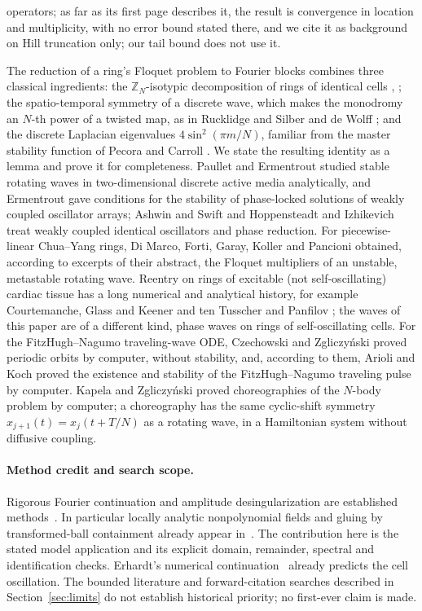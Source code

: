 \documentclass[11pt]{article}
\theoremstyle{definition}
\newcommand{\Z}{\mathbb{Z}}
\begin{document}
operators; as far as its first page describes it, the result is convergence in location and multiplicity, with no error bound stated there, and we cite it as background on Hill truncation only; our tail bound does not use it.

The reduction of a ring's Floquet problem to Fourier blocks combines three classical ingredients: the $\Z_N$-isotypic decomposition of rings of identical cells \cite{gs1985}, \cite[Ch.~XVIII, Sect.~4]{gss1988}; the spatio-temporal symmetry of a discrete wave, which makes the monodromy an $N$-th power of a twisted map, as in Rucklidge and Silber \cite{rs1998} and de Wolff \cite{dewolff2023}; and the discrete Laplacian eigenvalues $4\sin^2(\pi m/N)$, familiar from the master stability function of Pecora and Carroll \cite{pc1998}. We state the resulting identity as a lemma and prove it for completeness. Paullet and Ermentrout \cite{pe1994} studied stable rotating waves in two-dimensional discrete active media analytically, and Ermentrout \cite{ermentrout1992} gave conditions for the stability of phase-locked solutions of weakly coupled oscillator arrays; Ashwin and Swift \cite{as1992} and Hoppensteadt and Izhikevich \cite{hi1997} treat weakly coupled identical oscillators and phase reduction. For piecewise-linear Chua--Yang rings, Di Marco, Forti, Garay, Koller and Pancioni \cite{dmfgkp2016} obtained, according to excerpts of their abstract, the Floquet multipliers of an unstable, metastable rotating wave. Reentry on rings of excitable (not self-oscillating) cardiac tissue has a long numerical and analytical history, for example Courtemanche, Glass and Keener \cite{cgk1993} and ten Tusscher and Panfilov \cite{tp2006}; the waves of this paper are of a different kind, phase waves on rings of self-oscillating cells. For the FitzHugh--Nagumo traveling-wave ODE, Czechowski and Zgliczy\'nski \cite{cz2016} proved periodic orbits by computer, without stability, and, according to them, Arioli and Koch \cite{ak2015} proved the existence and stability of the FitzHugh--Nagumo traveling pulse by computer. Kapela and Zgliczy\'nski \cite{kz2003} proved choreographies of the $N$-body problem by computer; a choreography has the same cyclic-shift symmetry $x_{j+1}(t) = x_j(t + T/N)$ as a rotating wave, in a Hamiltonian system without diffusive coupling.

\paragraph{Method credit and search scope.} Rigorous Fourier continuation and amplitude desingularization are established methods~\cite{vbq2021,vblq2021}. In particular locally analytic nonpolynomial fields and gluing by transformed-ball containment already appear in~\cite[Sects.~2.2 and~6]{vblq2021}. The contribution here is the stated model application and its explicit domain, remainder, spectral and identification checks. Erhardt's numerical continuation~\cite{erhardt2025} already predicts the cell oscillation. The bounded literature and forward-citation searches described in Section~\ref{sec:limits} do not establish historical priority; no first-ever claim is made.
\end{document}
